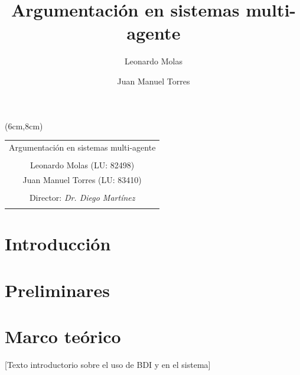 \documentclass[oneside]{book}
\title{Argumentación en sistemas multi-agente} %
\author{Leonardo Molas \and Juan Manuel Torres}
\theoremstyle{definition}
\theoremstyle{example}
\begin{document}


\thispagestyle{empty}

\begin{textblock*}{10cm} (6cm,8cm) %
\begin{center}
\begin{tabular}{c}
{\LARGE Argumentación en sistemas multi-agente} \\
\\
Leonardo Molas (LU: 82498)\\
Juan Manuel Torres (LU: 83410)\\
\\
Director: \emph{Dr. Diego Martínez}\\
\\
\end{tabular}
\end{center}
\end{textblock*}
\null
\vfill
\pagebreak
\thispagestyle{empty}

\setcounter{page}{1}


\tableofcontents

\chapter*{Introducción}




\chapter{Preliminares} 



\chapter{Marco teórico}

[Texto introductorio sobre el uso de BDI y  en el sistema]





\end{document}
